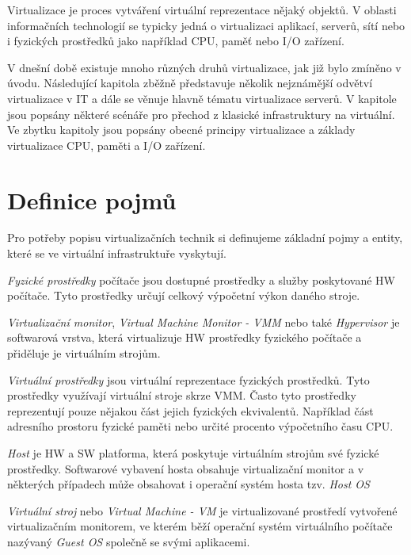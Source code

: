 \label{chapter:virtualization}
Virtualizace je proces vytváření virtuální reprezentace nějaký objektů. V oblasti informačních technologií se typicky jedná o virtualizaci aplikací, serverů, sítí nebo i fyzických prostředků jako například CPU,
paměť nebo I/O zařízení.

V dnešní době existuje mnoho různých druhů virtualizace, jak již bylo zmíněno v úvodu. Následující kapitola zběžně představuje několik nejznámější odvětví virtualizace v IT a dále se věnuje hlavně
tématu virtualizace serverů. V kapitole jsou popsány některé scénáře pro přechod z klasické infrastruktury na virtuální. Ve zbytku kapitoly jsou popsány obecné principy virtualizace a základy 
virtualizace CPU, paměti a I/O zařízení.

\section{Definice pojmů}
\label{definitions}

Pro potřeby popisu virtualizačních technik si definujeme základní pojmy a entity, které se ve virtuální infrastruktuře vyskytují.

\textit{Fyzické prostředky} počítače jsou dostupné prostředky a služby poskytované HW počítače. Tyto prostředky určují celkový výpočetní výkon daného stroje.

\textit{Virtualizační monitor}, \textit{Virtual Machine Monitor - VMM} nebo také \textit{Hypervisor} je softwarová vrstva, která virtualizuje HW prostředky fyzického počítače a přiděluje je
virtuálním strojům.

\textit{Virtuální prostředky} jsou virtuální reprezentace fyzických prostředků. Tyto prostředky využívají virtuální stroje skrze VMM. Často tyto prostředky reprezentují pouze nějakou část jejich
fyzických ekvivalentů. Například část adresního prostoru fyzické paměti nebo určité procento výpočetního času CPU.

\textit{Host} je HW a SW platforma, která poskytuje virtuálním strojům své fyzické prostředky. Softwarové vybavení hosta obsahuje virtualizační
monitor a v některých případech může obsahovat i operační systém hosta tzv. \textit{Host OS}

\textit{Virtuální stroj} nebo \textit{Virtual Machine - VM} je virtualizované prostředí vytvořené virtualizačním monitorem, ve kterém běží operační systém virtuálního počítače nazývaný \textit{Guest OS} společně
se svými aplikacemi.

